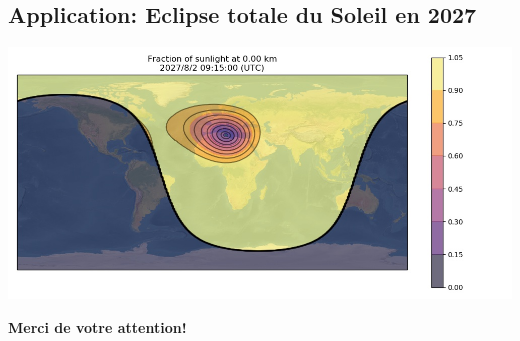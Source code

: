 \documentclass[%
oneside,                 %
final,                   %
10pt]{article}
\begin{document}
\vspace{6mm}



\subsection{Application: Eclipse totale du Soleil en 2027}


\vspace{6mm}

\centerline{\includegraphics[width=1.1\linewidth]{figs/eclipse-4659.jpg}}

\vspace{6mm}



\textbf{Merci de votre attention!}


\end{document}
